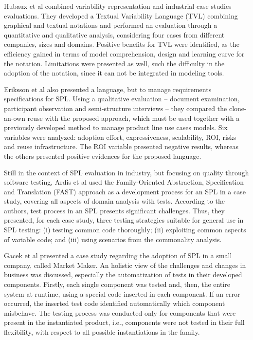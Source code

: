 Hubaux et al \cite{hubaux10} combined variability representation and industrial case studies evaluations. They developed a Textual Variability Language (TVL) combining graphical and textual notations and performed an evaluation through a quantitative and qualitative analysis, considering four cases from different companies, sizes and domains. Positive benefits for TVL were identified, as the efficiency gained in terms of model comprehension, design and learning curve for the notation. Limitations were presented as well, such the difficulty in the adoption of the notation, since it can not be integrated in modeling tools. 

Eriksson et al \cite{eriksson09} also presented a language, but to manage requirements specifications for SPL. Using a qualitative evaluation -- document examination, participant observation and semi-structure interviews -- they compared the clone-an-own reuse with the proposed approach, which must be used together with a previously developed method to manage product line use cases models. Six variables were analyzed: adoption effort, expressiveness, scalability, ROI, risks and reuse infrastructure. The ROI variable presented negative results, whereas the others presented positive evidences for the proposed language. 

Still in the context of SPL evaluation in industry, but focusing on quality through software testing, Ardis et al \cite{ardis00} used the Family-Oriented Abstraction, Specification and Translation (FAST) approach as a development process for an SPL in a case study, covering all aspects of domain analysis with tests. According to the authors, test process in an SPL presents significant challenges. Thus, they presented, for each case study, three testing strategies suitable for general use in SPL testing: (i) testing common code thoroughly; (ii) exploiting common aspects of variable code; and (iii) using scenarios from the commonality analysis. 

Gacek et al \cite{gacek01} presented a case study regarding the adoption of SPL in a small company, called Market Maker. An holistic view of the challenges and changes in business was discussed, especially the automatization of tests in their developed components. Firstly, each single component was tested and, then, the entire system at runtime, using a special code inserted in each component. If an error occurred, the inserted test code identified automatically which component misbehave. The testing process was conducted only for components that were present in the instantiated product, i.e., components were not tested in their full flexibility, with respect to all possible instantiations in the family.

